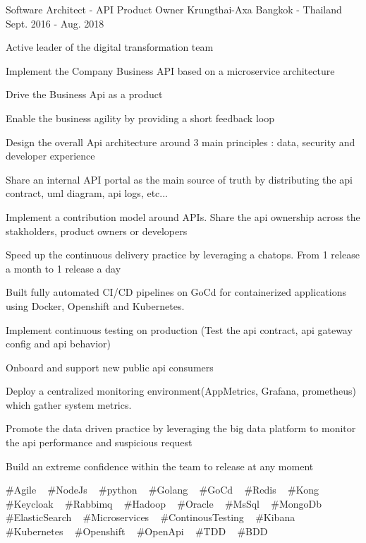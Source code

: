 \begin{cventries}
  \cventry
    {Software Architect - API Product Owner} %
    {Krungthai-Axa} %
    {Bangkok - Thailand} %
    {Sept. 2016 - Aug. 2018} %
    {
      \begin{cvitems} %
        \item {Active leader of the digital transformation team}
        \item {Implement the Company Business API based on a microservice architecture}
        \item {Drive the Business Api as a product}
        \item {Enable the business agility by providing a short feedback loop}
        \item {Design the overall Api architecture around 3 main principles : data, security and developer experience}
        \item {Share an internal API portal as the main source of truth by distributing the api contract, uml diagram, api logs, etc...}
        \item {Implement a contribution model around APIs. Share the api ownership across the stakholders, product owners or developers}
        \item {Speed up the continuous delivery practice by leveraging a chatops. From 1 release a month to 1 release a day}
        \item {Built fully automated CI/CD pipelines on GoCd for containerized applications using Docker, Openshift and Kubernetes.}
        \item {Implement continuous testing on production (Test the api contract, api gateway config and api behavior)}
        \item {Onboard and support new public api consumers}
        \item {Deploy a centralized monitoring environment(AppMetrics, Grafana, prometheus) which gather system metrics.}
        \item {Promote the data driven practice by leveraging the big data platform to monitor the api performance and suspicious request}
        \item {Build an extreme confidence within the team to release at any moment}
      \end{cvitems}
    }
    {
      \#Agile ~
      \#NodeJs ~
      \#python ~
      \#Golang ~
      \#GoCd ~
      \#Redis ~
      \#Kong ~
      \#Keycloak ~
      \#Rabbimq ~
      \#Hadoop ~
      \#Oracle ~
      \#MsSql ~
      \#MongoDb ~
      \#ElasticSearch ~
      \#Microservices ~
      \#ContinousTesting ~
      \#Kibana ~
      \#Kubernetes ~
      \#Openshift ~
      \#OpenApi ~
      \#TDD ~
      \#BDD
    }


\end{cventries}
